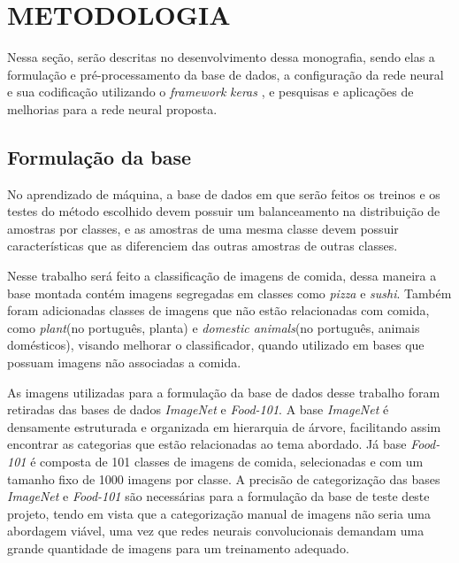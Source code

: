
\chapter{METODOLOGIA}
\label{chap:metodologia}
Nessa seção, serão descritas no desenvolvimento dessa monografia, sendo elas a formulação e pré-processamento da base de dados, a configuração da rede neural e sua codificação utilizando o \textit{framework} \textit{keras} \cite{chollet2015keras}, e pesquisas e aplicações de melhorias para a rede neural proposta.

\section{Formulação da base}
No aprendizado de máquina, a base de dados em que serão feitos os treinos e os testes do método escolhido devem possuir um balanceamento na distribuição de amostras por classes, e as amostras de uma mesma classe devem possuir características que as diferenciem das outras amostras de outras classes.

\par Nesse trabalho será feito a classificação de imagens de comida, dessa maneira a base montada contém imagens segregadas em classes como \textit{pizza} e \textit{sushi}. Também foram adicionadas classes de imagens que não estão relacionadas com comida, como \textit{plant}(no português, planta) e \textit{domestic animals}(no português, animais domésticos), visando melhorar o classificador, quando utilizado em bases que possuam imagens não associadas a comida.
\par As imagens utilizadas para a formulação da base de dados desse trabalho foram retiradas das bases de dados \textit{ImageNet}\cite{deng2009imagenet} e \textit{Food-101}\cite{bossard14}. A base \textit{ImageNet} é densamente estruturada e organizada em hierarquia de árvore, facilitando assim encontrar as categorias que estão relacionadas ao tema abordado. Já base \textit{Food-101} é composta de 101 classes de imagens de comida, selecionadas e com um tamanho fixo de 1000 imagens por classe. A precisão de categorização das bases \textit{ImageNet} e \textit{Food-101} são necessárias para a formulação da base de teste deste projeto, tendo em vista que a categorização manual de imagens não seria uma abordagem viável, uma vez que redes neurais convolucionais demandam uma grande quantidade de imagens para um treinamento adequado.  

